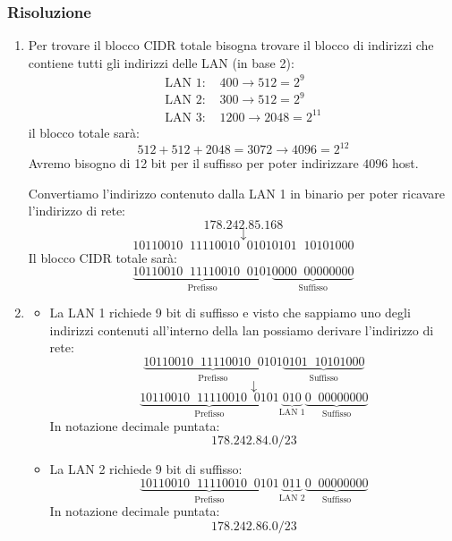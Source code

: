 \documentclass[a4paper]{article}
\begin{document}
\subsubsection{Risoluzione}
\begin{enumerate}
  \item 
    Per trovare il blocco CIDR totale bisogna trovare il blocco di indirizzi che
    contiene tutti gli indirizzi delle LAN (in base 2):
    \[
      \begin{aligned}
        \text{LAN 1: } & 400 \to 512 = 2^9\\
        \text{LAN 2: } & 300 \to 512 = 2^9\\
        \text{LAN 3: } & 1200 \to 2048 = 2^{11}
      \end{aligned}
    \] 
    il blocco totale sarà:
    \[
      512 + 512 + 2048 = 3072 \to 4096 = 2^{12}
    \] 
    Avremo bisogno di 12 bit per il suffisso per poter indirizzare \( 4096 \) host.

    \vspace{1em}
    \noindent
    Convertiamo l'indirizzo contenuto dalla LAN 1 in binario per poter ricavare l'indirizzo
    di rete:
    \[
        178.242.85.168
    \]
    \[
    \downarrow
    \] 
    \[
       10110010 \;\; 11110010 \;\; 01010101 \;\; 10101000
    \] 
    Il blocco CIDR totale sarà:
    \[
      \underbrace{10110010 \;\; 11110010 \;\; 0101}_{\text{Prefisso}}
      \underbrace{0000 \;\; 00000000}_{\text{Suffisso}}
    \]

  \item \begin{itemize}
    \item La LAN 1 richiede 9 bit di suffisso e visto che sappiamo uno degli indirizzi
      contenuti all'interno della lan possiamo derivare l'indirizzo di rete:
      \[
        \underbrace{10110010 \;\; 11110010 \;\; 0101}_{\text{Prefisso}}
        \underbrace{0101 \;\; 10101000}_{\text{Suffisso}}
      \]
      \[
      \downarrow
      \] 
      \[
        \underbrace{10110010 \;\; 11110010 \;\; 0101}_{\text{Prefisso}}
        \underbrace{010}_{\text{LAN 1}}
        \underbrace{0 \;\; 00000000}_{\text{Suffisso}}
      \]
      In notazione decimale puntata:
      \[
      178.242.84.0/23
      \] 

    \item La LAN 2 richiede 9 bit di suffisso:
      \[
        \underbrace{10110010 \;\; 11110010 \;\; 0101}_{\text{Prefisso}}
        \underbrace{011}_{\text{LAN 2}}
        \underbrace{0 \;\; 00000000}_{\text{Suffisso}}
      \]
      In notazione decimale puntata:
      \[
      178.242.86.0/23
      \] 


\end{itemize}
\end{enumerate}
\end{document}

